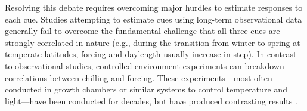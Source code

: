 \documentclass{article}
\begin{document}
\par Resolving this debate requires overcoming major hurdles to estimate responses to each cue. Studies attempting to estimate cues using long-term observational data \citep[e.g.,][]{vitasse2013, zohner2016} generally fail to overcome the fundamental challenge that all three cues are strongly correlated in nature (e.g., during the transition from winter to spring at temperate latitudes, forcing and daylength usually increase in step). In contrast to observational studies, controlled environment experiments can breakdown correlations between chilling and forcing. These experiments---most often conducted in growth chambers or similar systems to control temperature and light---have been conducted for decades, but have produced contrasting results \citep{zohner2016,Laube:2014a,Basler:2012,Caffarra:2011b,Caffarra:2011a}. 


\end{document}
